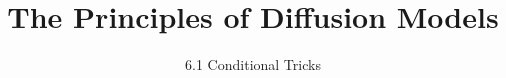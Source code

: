 
\title{The Principles of Diffusion Models}
\subtitle{6.1 Conditional Tricks}


\begin{frame}
    \titlepage
\end{frame}


